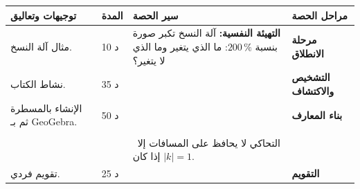 \documentclass[12pt,a4paper]{article}
\newenvironment{LTR}{\begin{otherlanguage}{english}}{\end{otherlanguage}}
\newcommand{\ar}[1]{\foreignlanguage{arabic}{#1}}
\newcommand{\Phase}[1]{\textbf{#1}}
\newenvironment{Sayr}{%
\begin{LTR}\renewcommand{\arraystretch}{1.25}
\begin{longtable}{|p{0.17\textwidth}|>{\centering\arraybackslash}p{0.06\textwidth}|p{0.53\textwidth}|>{\centering\arraybackslash}p{0.12\textwidth}|}
\hline\rowcolor{cThm!12}\ar{\textbf{توجيهات وتعاليق}} & \ar{\textbf{المدة}} & \ar{\textbf{سير الحصة}} & \ar{\textbf{مراحل الحصة}}\\\hline\endhead
\hline\endfoot}{\end{longtable}\end{LTR}}
\newcommand{\Row}[4]{\ar{\small #4} & \ar{#3} & \ar{#2} & \cellcolor{cThm!8}\ar{\Phase{#1}}\\\hline}
\newcommand{\Lab}[2]{\foreignlanguage{english}{\tcbox[on line,colback=#1,colframe=#1,boxrule=0pt,arc=2pt,boxsep=1pt,left=5pt,right=5pt,top=1pt,bottom=1pt]{\ar{\textcolor{white}{\textbf{#2}}}}}}
\newcommand{\ck}{\ensuremath{{\color{cRem}\checkmark}}}
\begin{document}
\begin{Sayr}
\Row{مرحلة الانطلاق}{%
\textbf{التهيئة النفسية:} آلة النسخ تكبر صورة بنسبة $200\,\%$: ما الذي يتغير وما الذي لا يتغير؟}{10 د}{مثال آلة النسخ.}
\Row{التشخيص والاكتشاف}{%
\Lab{cEx}{مناقشة نشاط 02 صفحة 313}\par\ck\ مربعان $ABCD$ و $BEFG$ ضلعاهما $3$ و $2$: المستقيمان $(AC)$ و $(BF)$ متوازيان ، والعلاقة الشعاعية بين الأشعة المرفقة تعطي نسبة ثابتة.\par
\ck\ استقامية النقط $I$ ، $G$ ، $D$.\par
}{35 د}{نشاط الكتاب.}
\Row{بناء المعارف}{%
\Lab{cDef}{تعريف}\ $O$ نقطة و $k$ عدد حقيقي غير معدوم. \textbf{التحاكي} الذي مركزه $O$ ونسبته $k$ هو التحويل الذي يرفق بكل نقطة $M$ النقطة $M_1$ حيث $\overrightarrow{OM_1}=k\overrightarrow{OM}$.\par\Lab{cEx}{تحاكٍ نسبته $2$}\par\smallskip\begin{LTR}\centering \begin{tikzpicture}[scale=0.8,font=\scriptsize]
\coordinate (O) at (0,0); \coordinate (A) at (1,-0.3); \coordinate (B) at (2.2,0.5); \coordinate (C) at (1.2,1.3);
\coordinate (A1) at (2,-0.6); \coordinate (B1) at (4.4,1); \coordinate (C1) at (2.4,2.6);
\draw[cDef!60,dashed] (O)--(A1) (O)--(B1) (O)--(C1);
\draw[thick,cDef,fill=cDef!12] (A)--(B)--(C)--cycle; \draw[thick,cThm,fill=cThm!10] (A1)--(B1)--(C1)--cycle;
\fill (O) circle (1.5pt) node[left]{$O$};
\foreach \p/\q in {A/below,B/below,C/left,A1/below,B1/right,C1/above} \fill (\p) circle (1.2pt);
\node[below] at (A){$A$}; \node[above left] at (B){$B$}; \node[left] at (C){$C$};
\node[below] at (A1){$A_1$}; \node[right] at (B1){$B_1$}; \node[above] at (C1){$C_1$};
\end{tikzpicture}\end{LTR}\par }{50 د}{الإنشاء بالمسطرة ثم بـ GeoGebra.}
\Row{}{%
\Lab{cThm}{خاصية}\ إذا كانت $M_1$ و $N_1$ صورتي $M$ و $N$:\par\ck\ $\overrightarrow{M_1N_1}=k\overrightarrow{MN}$ و $M_1N_1=|k|\,MN$.\par
\ck\ التحاكي يحافظ على الاستقامية والتوازي والزوايا ، ويحول مستقيماً إلى مستقيم يوازيه.\par
\ck\ صورة دائرة $(O^{\prime};r)$ دائرة مركزها صورة $O^{\prime}$ ونصف قطرها $|k|r$ ؛ المساحات تضرب في $k^2$.\par
\Lab{cRem}{ملاحظات}\ $k=-1$: التناظر المركزي ؛ $k=1$: التحويل المطابق.\par}{}{}
\Row{}{%
\Lab{cThm!80!black}{حذار}\ التحاكي لا يحافظ على المسافات إلا إذا كان $|k|=1$.}{}{}
\Row{التقويم}{%
\Lab{cEx}{تطبيق}\par أنشئ صورة المثلث $ABC$ بالتحاكي $h$ الذي مركزه $A$ ونسبته $-\frac12$. ما نسبة مساحتي المثلثين؟\par\textbf{الحل:} $A_1=A$ ، $\overrightarrow{AB_1}=-\frac12\overrightarrow{AB}$ ، $\overrightarrow{AC_1}=-\frac12\overrightarrow{AC}$ ؛ نسبة المساحتين $\left(-\frac12\right)^2=\frac14$.\par\textbf{واجب منزلي:} تمارين 21 ، 22 ، 23 ، 24 ، 31 من باب التحويلات.\par\smallskip\textbf{ملاحظات حول سير الحصة:} \dotfill}{25 د}{تقويم فردي.}
\end{Sayr}
\end{document}
